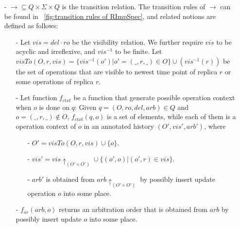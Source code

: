 \begin{itemize}
\item[-] $\rightarrow \subseteq Q \times \Sigma \times Q$ is the transition relation. The transition rules of $\rightarrow$ can be found in \figurename~\ref{fig:transition rules of RImpSpec}, and related notions are defined as follows:


    \begin {itemize}
    \item[-] Let $\mathit{vis} = \mathit{del} \cdot \mathit{ro}$ be the visibility relation. We further require $\mathit{vis}$ to be acyclic and irreflexive, and $\mathit{vis}^{-1}$ to be finite. Let $visTo(O,r,\mathit{vis}) = \{ vis^{-1}(o') \vert o'=(\_,r,\_) \in O \} \cup (vis^{-1}(r))$ be the set of operations that are visible to newest time point of replica $r$ or some operations of replica $r$.

    \item[-] Let function $f_{\mathit{ctxt}}$ be a function that generate possible operation context when $o$ is done on $q$: Given $q = (O,\mathit{ro},\mathit{del},\mathit{arb}) \in Q$ and $o=(\_,r,\_) \notin O$, $f_{\mathit{ctxt}}(q,o)$ is a set of elements, while each of them is a operation context of $o$ in an annotated history $(O',\mathit{vis}',\mathit{arb}')$, where

        \begin{itemize}
        \setlength{\itemsep}{0.5pt}
        \item[-] $O' = visTo(O,r,\mathit{vis}) \cup \{ o \}$.

        \item[-] $\mathit{vis'} = \mathit{vis} \uparrow_{(O' \times O')} \cup \{ (o',o) \vert (o',r) \in \mathit{vis} \}$.

        \item[-] $\mathit{arb}'$ is obtained from $\mathit{arb} \uparrow_{(O' \times O')}$ by possibly insert update operation $o$ into some place.
        \end{itemize}

    \item[-] $f_{\mathit{ar}}(\mathit{arb},o)$ returns an arbitration order that is obtained from $\mathit{arb}$ by possibly insert update $o$ into some place.


\end{itemize}
\end{itemize}
